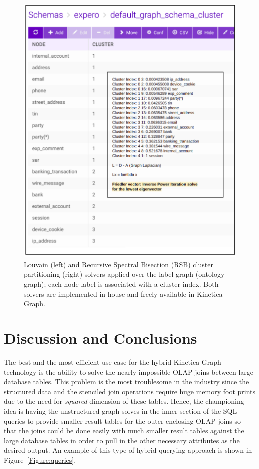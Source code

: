 \documentclass[preprint,3p,twocolumn]{elsarticle}
\begin{document}
\begin{figure}
\centering
    \includegraphics[width=0.9\linewidth, keepaspectratio]{clusters.pdf} 
    \caption{Louvain (left) and Recursive Spectral Bisection (RSB) cluster partitioning (right) solvers applied over the label graph (ontology graph); each node label is associated with a cluster index. Both solvers are implemented in-house and freely available in Kinetica-Graph.}
    \label{Figure:clusters}
\end{figure}

\section{Discussion and Conclusions}
\label{Section:Conclusions}

The best and the most efficient use case for the hybrid  Kinetica-Graph technology is the ability to solve the nearly impossible OLAP joins between large database tables. This problem is the most troublesome in the industry since the structured data and the  stenciled join operations require huge  memory foot prints due to the need for \textit{squared} dimension of these tables. Hence, the championing idea is having the unstructured graph solves in the inner section of the SQL queries to provide smaller result tables for the outer enclosing OLAP joins so that the joins could be done easily with much smaller result tables against the large database tables in order to pull in the other necessary attributes as the desired output. An example of this type of hybrid querying approach is shown in Figure~\ref{Figure:queries}. 
\end{document}
